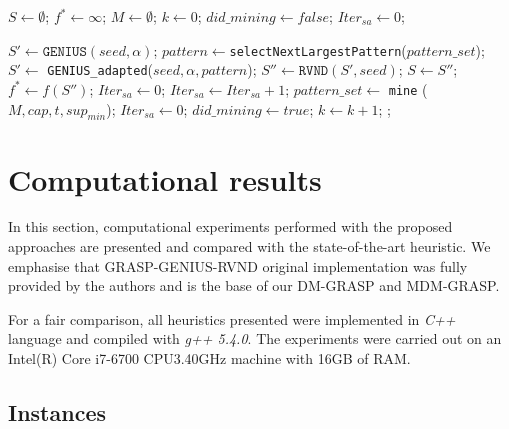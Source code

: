 \documentclass{singlecol-new}
\begin{document}
\begin{algorithm}[h]
  {\small
	\caption{\hspace{-1mm}: MDM-GRASP($maxIt, seed, t, cap, \alpha, sup_{min}, \omega$)}	
	\label{alg:mdm-grasp}
	\begin{algorithmic}[1]
		
		\STATE $S \gets \emptyset$; $f^* \gets \infty$;  $M \gets \emptyset$; $k \gets 0$; $did\_mining \gets false$; $Iter_{sa} \gets 0$;
		
%		
		
				\STATE $S' \gets \texttt{GENIUS} (seed, \alpha)$; 
			\ELSE
				\STATE $pattern \gets $\texttt{selectNextLargestPattern}($pattern\_set$); 
				\STATE $S' \gets$ \texttt{GENIUS\_adapted}($seed, \alpha, pattern$); 
			\ENDIF
			\STATE $S'' \gets \texttt{RVND} (S', seed)$; 
			\STATE $S \gets S''$; $f^* \gets f(S'')$;
			\ENDIF
				\STATE $Iter_{sa} \gets 0$;
			\ELSE
				\STATE $Iter_{sa} \gets Iter_{sa} + 1$;
			\ENDIF
				\STATE $pattern\_set \gets$ \texttt{mine} ($M,cap,t, sup_{min}$);
				\STATE $Iter_{sa} \gets 0$;
				\STATE $did\_mining\gets true$;
			\ENDIF	
			\STATE $k \gets k + 1$;
		\ENDWHILE
		;
		
	\end{algorithmic}
}
\end{algorithm}


\section{Computational results}

\label{sec:computationalresults}

In this section, computational experiments performed with the proposed approaches are presented and compared with the state-of-the-art heuristic. We emphasise that GRASP-GENIUS-RVND original implementation was fully provided by
the authors and is the base of our DM-GRASP and MDM-GRASP. 

For a fair comparison, all heuristics presented were implemented in \textit{C++} language and compiled with \textit{g++ 5.4.0}. The experiments were carried out on an Intel(R) Core i7-6700 CPU\@ 3.40GHz machine with 16GB of RAM. 


\subsection{Instances}
\end{document}
